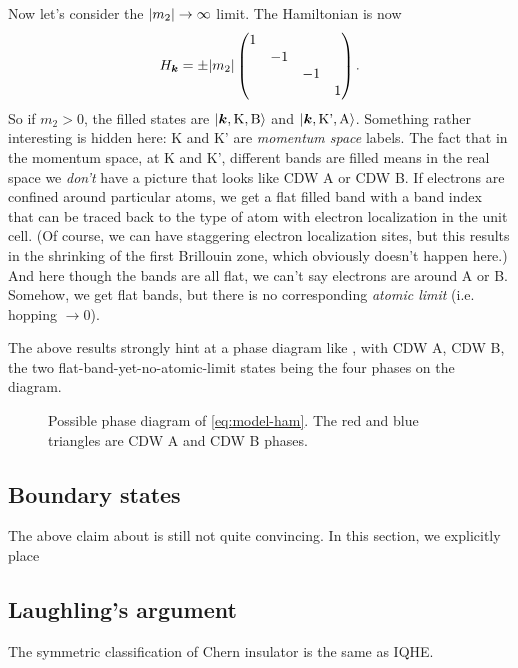 \documentclass[hyperref, a4paper]{article}
\begin{document}
Now let's consider the $\abs{m_2} \to \infty$ limit.
The Hamiltonian is now 
\begin{equation}
    H_{\vb*{k}} = \pm \abs{m_2} \pmqty{\dmat{1, -1, -1, 1}}.
\end{equation}
So if $m_2 > 0$, the filled states are $\ket{\vb*{k}, \text{K}, \text{B}}$
and $\ket{\vb*{k}, \text{K'}, \text{A}}$.
Something rather interesting is hidden here:
K and K' are \emph{momentum space} labels.
The fact that in the momentum space,
at K and K',
different bands are filled 
means in the real space we \emph{don't} have a picture that looks like CDW A or CDW B.
If electrons are confined around particular atoms,
we get a flat filled band
with a band index that can be traced back to the type of atom with electron localization in the unit cell.
(Of course, we can have staggering electron localization sites,
but this results in the shrinking of the first Brillouin zone,
which obviously doesn't happen here.)
And here though the bands are all flat,
we can't say electrons are around A or B.
Somehow, we get flat bands,
but there is no corresponding \emph{atomic limit} (i.e. hopping $\to 0$).

The above results strongly hint at a phase diagram like ,
with CDW A, CDW B, the two flat-band-yet-no-atomic-limit states 
being the four phases on the diagram.

\begin{figure}
    \centering
    
    \caption{Possible phase diagram of \eqref{eq:model-ham}. The red and blue triangles are CDW A and CDW B phases.}
    \label{fig:possible-phase-1}
\end{figure}

\subsection{Boundary states}

The above claim about  is still not quite convincing.
In this section, 
we explicitly place

\subsection{Laughling's argument}

The symmetric classification of Chern insulator is the same as IQHE.
\end{document}
